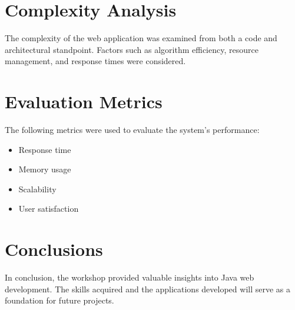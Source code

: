\documentclass{article}
\begin{document}
\section{Complexity Analysis}
The complexity of the web application was examined from both a code and architectural standpoint. Factors such as algorithm efficiency, resource management, and response times were considered.

\section{Evaluation Metrics}
The following metrics were used to evaluate the system's performance:
\begin{itemize}
    \item Response time
    \item Memory usage
    \item Scalability
    \item User satisfaction
\end{itemize}

\section{Conclusions}
In conclusion, the workshop provided valuable insights into Java web development. The skills acquired and the applications developed will serve as a foundation for future projects.
\end{document}
